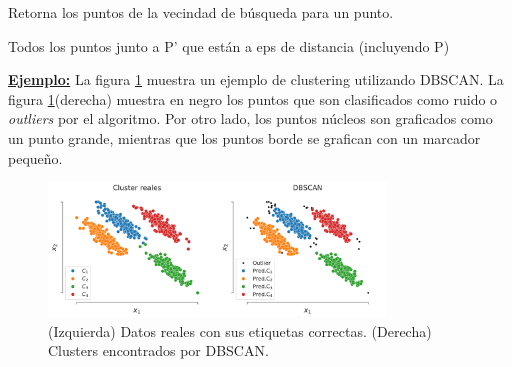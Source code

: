 \begin{algorithm}[H]
  \caption{Retorna los puntos de la vecindad de búsqueda para un punto.
    \label{alg:regionDeConsulta}}
  \begin{algorithmic}[1]
    
    \Return Todos los puntos junto a P' que están a eps de distancia (incluyendo P)
    \EndFunction
  \end{algorithmic}
\end{algorithm}


\underline{\textbf{Ejemplo:}} La figura \ref{fig:dbscan} muestra un ejemplo de clustering utilizando DBSCAN. La figura \ref{fig:dbscan}(derecha) muestra en negro los puntos que son clasificados como ruido o \emph{outliers} por el algoritmo. Por otro lado, los puntos núcleos son graficados como un punto grande, mientras que los puntos borde se grafican con un marcador pequeño.

\begin{figure}[H]
  \centering
  \includegraphics[width=0.8\textwidth]{img/cap7_dbscan}
  \caption{(Izquierda) Datos reales con sus etiquetas correctas. (Derecha) Clusters encontrados por DBSCAN.}
  \label{fig:dbscan}
\end{figure}